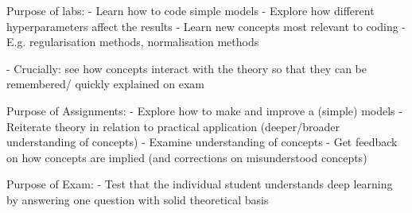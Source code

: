 Purpose of labs:
- Learn how to code simple models
- Explore how different hyperparameters affect the results
- Learn new concepts most relevant to coding 
    - E.g. regularisation methods, normalisation methods

- Crucially: see how concepts interact with the theory so that they can be remembered/ quickly explained on exam


Purpose of Assignments:
- Explore how to make and improve a (simple) models
- Reiterate theory in relation to practical application (deeper/broader understanding of concepts)
- Examine understanding of concepts
- Get feedback on how concepts are implied (and corrections on misunderstood concepts)

Purpose of Exam:
- Test that the individual student understands deep learning by answering one question with solid theoretical basis